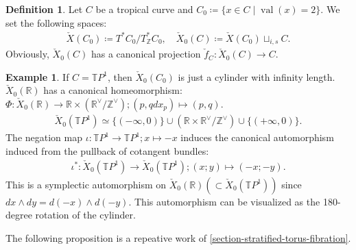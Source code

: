 \documentclass[a4paper,dvipdfmx,reqno,12pt]{amsart}
\theoremstyle{definition}
\newtheorem{definition}[theorem]{Definition}
\newtheorem{example}[theorem]{Example}
\newcommand{\deq}{\coloneqq}
\newcommand{\Z}{\mathbb{Z}}%
\newcommand{\opn}[1]{\operatorname{#1}}
\numberwithin{equation}{section}
\begin{document}
\begin{definition}
\label{definition-continuous-section}
Let $C$ be a tropical curve and 
$C_{0}\deq \{x\in C\mid \opn{val}(x)=2\}$.
We set the following spaces:
\begin{align}
\check{X}(C_0)\deq T^{*}C_0/T^{*}_{\Z}C_0, \quad 
\check{X}_0(C)\deq \check{X}(C_0)\sqcup_{i,s}C.
\end{align}
Obviously, $\check{X}_0(C)$ has a canonical projection
$\check{f}_C \colon \check{X}_0(C)\to C$.
\end{definition}

\begin{example}
If $C=\mathbb{T}P^{1}$, then 
$\check{X}_0(C_0)$ is just a 
cylinder with infinity length.
$\check{X}_0(\mathbb{R})$ has a canonical homeomorphism:
$\Phi \colon \check{X}_0(\mathbb{R})\to 
\mathbb{R}\times (\mathbb{R}^{\vee}/\mathbb{Z}^{\vee});
(p,q dx_p)\mapsto (p,q)$.
\begin{align}
\check{X}_0(\mathbb{T}P^{1})\simeq 
\{(-\infty,0)\}\cup(\mathbb{R}\times 
\mathbb{R}^{\vee}/\mathbb{Z}^{\vee})
\cup \{(+\infty,0)\}.
\end{align}
The negation map
$\iota \colon\mathbb{T}P^{1}\to \mathbb{T}P^{1}; x\mapsto -x$
induces the canonical automorphism induced from the pullback of cotangent bundles:
\begin{align}
\iota^{*}\colon \check{X}_0(\mathbb{T}P^{1})
\to \check{X}_0(\mathbb{T}P^{1}); (x;y)\mapsto (-x;-y). 
\end{align}
This is a symplectic automorphism on 
$\check{X}_0(\mathbb{R}) (\subset \check{X}_0(\mathbb{T}P^{1}))$ since 
$dx\wedge dy=d(-x)\wedge d(-y)$.
This automorphism can be visualized as the 180-degree rotation of the 
cylinder.
\end{example}

The following proposition is a repeative work of
\cref{section-stratified-torus-fibration}.
\end{document}
